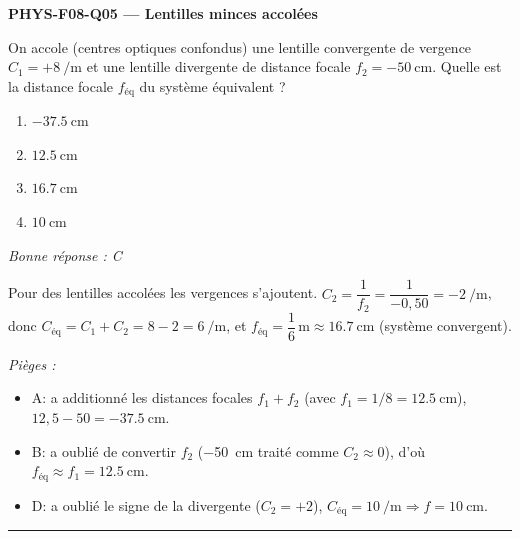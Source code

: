 \documentclass[11pt,a4paper]{article}
\begin{document}
\noindent\textbf{PHYS-F08-Q05 --- Lentilles minces accolées}\par
On accole (centres optiques confondus) une lentille convergente de vergence $C_1=+\qty{8}{\per\metre}$ et une
lentille divergente de distance focale $f_2=\qty{-50}{\centi\metre}$. Quelle est la distance focale
$f_{\text{éq}}$ du système équivalent ?
\begin{enumerate}[label=\Alph*)]
\item $\qty{-37.5}{\centi\metre}$
\item $\qty{12.5}{\centi\metre}$
\item $\qty{16.7}{\centi\metre}$
\item $\qty{10}{\centi\metre}$
\end{enumerate}
\textit{Bonne réponse : C}\par
Pour des lentilles accolées les vergences s'ajoutent. $C_2=\dfrac{1}{f_2}=\dfrac{1}{-0{,}50}=\qty{-2}{\per\metre}$,
donc $C_{\text{éq}}=C_1+C_2=8-2=\qty{6}{\per\metre}$, et $f_{\text{éq}}=\dfrac16\,\text{m}\approx\qty{16.7}{\centi\metre}$
(système convergent).\par
\textit{Pièges :}
\begin{itemize}
\item A: a additionné les distances focales $f_1+f_2$ (avec $f_1=1/8=\qty{12.5}{\centi\metre}$), $12{,}5-50=\qty{-37.5}{\centi\metre}$.
\item B: a oublié de convertir $f_2$ (\qty{-50}{\centi\metre} traité comme $C_2\approx0$), d'où $f_{\text{éq}}\approx f_1=\qty{12.5}{\centi\metre}$.
\item D: a oublié le signe de la divergente ($C_2=+2$), $C_{\text{éq}}=\qty{10}{\per\metre}\Rightarrow f=\qty{10}{\centi\metre}$.
\end{itemize}
\vspace{8pt}\hrule\vspace{8pt}
\end{document}
